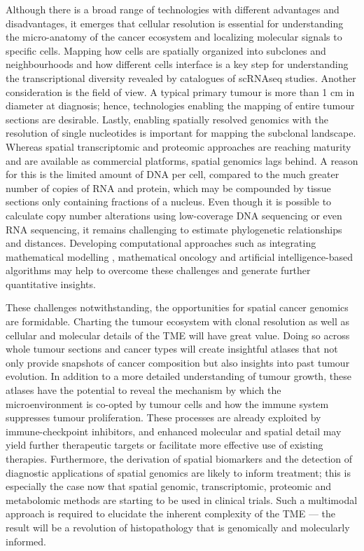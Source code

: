Although there is a broad range of technologies with different advantages and disadvantages, it emerges that cellular resolution is essential for understanding the micro-anatomy of the cancer ecosystem and localizing molecular signals to specific cells. Mapping how cells are spatially organized into subclones and neighbourhoods and how different cells interface is a key step for understanding the transcriptional diversity revealed by catalogues of \ac{scRNAseq} studies. Another consideration is the field of view. A typical primary tumour is more than 1 cm in diameter at diagnosis; hence, technologies enabling the mapping of entire tumour sections are desirable. Lastly, enabling spatially resolved genomics with the resolution of single nucleotides is important for mapping the subclonal landscape. Whereas spatial transcriptomic and proteomic approaches are reaching maturity and are available as commercial platforms, spatial genomics lags behind. A reason for this is the limited amount of DNA per cell, compared to the much greater number of copies of RNA and protein, which may be compounded by tissue sections only containing fractions of a nucleus. Even though it is possible to calculate copy number alterations using low-coverage DNA sequencing or even RNA sequencing, it remains challenging to estimate phylogenetic relationships and distances. Developing computational approaches such as integrating mathematical modelling \parencite{Gatenbee2022-hb}, mathematical oncology and artificial intelligence-based algorithms may help to overcome these challenges and generate further quantitative insights.

These challenges notwithstanding, the opportunities for spatial cancer genomics are formidable. Charting the tumour ecosystem with clonal resolution as well as cellular and molecular details of the \ac{TME} will have great value. Doing so across whole tumour sections and cancer types will create insightful atlases that not only provide snapshots of cancer composition but also insights into past tumour evolution. In addition to a more detailed understanding of tumour growth, these atlases have the potential to reveal the mechanism by which the microenvironment is co-opted by tumour cells and how the immune system suppresses tumour proliferation. These processes are already exploited by immune-checkpoint inhibitors, and enhanced molecular and spatial detail may yield further therapeutic targets or facilitate more effective use of existing therapies. Furthermore, the derivation of spatial biomarkers and the detection of diagnostic applications of spatial genomics are likely to inform treatment; this is especially the case now that spatial genomic, transcriptomic, proteomic and metabolomic methods are starting to be used in clinical trials. Such a multimodal approach is required to elucidate the inherent complexity of the \ac{TME} — the result will be a revolution of histopathology that is genomically and molecularly informed.

